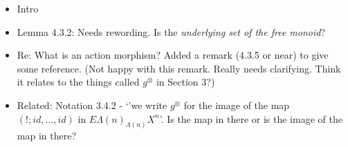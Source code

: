 \documentclass{amsart}
\begin{document}
\begin{itemize}
\item Intro
\item Lemma 4.3.2: Needs rewording. Is the \textit{underlying set of the free monoid}?
\item Re: What is an action morphism? Added a remark (4.3.5 or near) to give some reference. (Not happy with this remark. Really needs clarifying. Think it relates to the things called $g^\otimes$ in Section 3?)
\item Related: Notation 3.4.2 - `'we write $g^\otimes$ for the image of the map $(!;id,\ldots,id)$ in $E\Lambda(n)_{\Lambda(n)}X^n$'. Is the map in there or is the image of the map in there?

\end{itemize}
\end{document}
